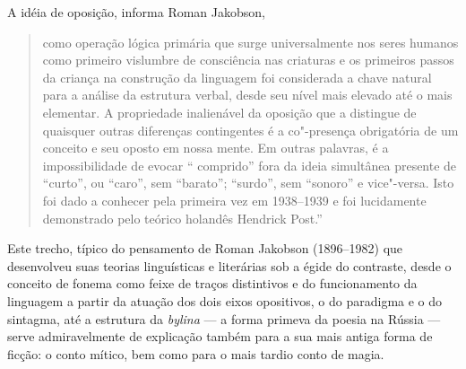 A idéia de oposição, informa Roman Jakobson,

\begin{quote}
como operação lógica primária que surge
universalmente nos seres humanos como primeiro vislumbre de consciência
nas criaturas e os primeiros passos da criança na construção da
linguagem foi considerada a chave natural para a análise da estrutura
verbal, desde seu nível mais elevado até o mais elementar. A propriedade
inalienável da oposição que a distingue de quaisquer outras diferenças
contingentes é a co"-presença obrigatória de um conceito e seu oposto em
nossa mente. Em outras palavras, é a impossibilidade de evocar ``
comprido'' fora da ideia simultânea presente de ``curto'', ou ``caro'',
sem ``barato''; ``surdo'', sem ``sonoro'' e vice"-versa. Isto foi dado
a conhecer pela primeira vez em 1938--1939 e foi lucidamente demonstrado
pelo teórico holandês Hendrick Post.''
\end{quote}



Este trecho, típico do pensamento de Roman Jakobson (1896--1982) que
desenvolveu suas teorias linguísticas e literárias sob a égide do
contraste, desde o conceito de fonema como feixe de traços distintivos e
do funcionamento da linguagem a partir da atuação dos dois eixos
opositivos, o do paradigma e o do sintagma, até a estrutura
da \emph{bylina} --- a forma primeva da poesia na Rússia --- serve
admiravelmente de explicação também para a sua mais antiga forma de
ficção: o conto mítico, bem como para o mais tardio conto de
magia.


